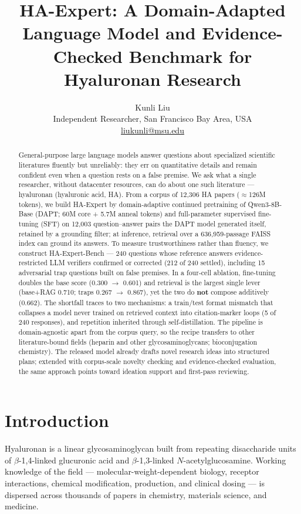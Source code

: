 \documentclass[11pt]{article}
\title{HA-Expert: A Domain-Adapted Language Model and Evidence-Checked
Benchmark for Hyaluronan Research}
\author{Kunli Liu\\
Independent Researcher, San Francisco Bay Area, USA\\
\href{mailto:liukunli@msu.edu}{liukunli@msu.edu}}
\date{}
\begin{document}
\maketitle


\begin{abstract}
General-purpose large language models answer questions about
specialized scientific literatures fluently but unreliably: they err
on quantitative details and remain confident even when a question rests
on a false premise. We ask what a single researcher, without
datacenter resources, can do about one such literature ---
hyaluronan (hyaluronic acid, HA). From a corpus of 12,306 HA papers
($\approx$126M tokens), we build HA-Expert by domain-adaptive
continued pretraining of Qwen3-8B-Base (DAPT; 60M core + 5.7M anneal tokens) and
full-parameter supervised fine-tuning (SFT) on 12,003
question--answer pairs the DAPT model generated itself, retained by a
grounding filter; at inference, retrieval over a 636,959-passage FAISS
index can ground its answers. To measure trustworthiness rather than
fluency, we construct HA-Expert-Bench --- 240 questions whose
reference answers evidence-restricted LLM verifiers confirmed or
corrected (212 of 240 settled), including 15 adversarial trap
questions built on false premises. In a four-cell ablation,
fine-tuning doubles the base score (0.300 $\rightarrow$ 0.601) and
retrieval is the largest single lever (base+RAG 0.710; traps 0.267
$\rightarrow$ 0.867), yet the two do \textbf{not} compose additively
(0.662). The shortfall traces to two mechanisms: a train/test format
mismatch that collapses a model never trained on retrieved context
into citation-marker loops (5 of 240 responses), and repetition
inherited through self-distillation. The pipeline is domain-agnostic
apart from the corpus query, so the recipe transfers to other
literature-bound fields (heparin and other glycosaminoglycans;
bioconjugation chemistry). The released model already drafts novel
research ideas into structured plans; extended with corpus-scale
novelty checking and evidence-checked evaluation, the same approach
points toward ideation support and first-pass reviewing.
\end{abstract}

\section{Introduction}
\label{sec:intro}

Hyaluronan is a linear glycosaminoglycan built from repeating
disaccharide units of $\beta$-1,4-linked glucuronic acid and
$\beta$-1,3-linked $N$-acetylglucosamine. Working knowledge of the
field --- molecular-weight-dependent biology, receptor interactions,
chemical modification, production, and clinical dosing --- is dispersed
across thousands of papers in chemistry, materials science, and
medicine.
\end{document}
